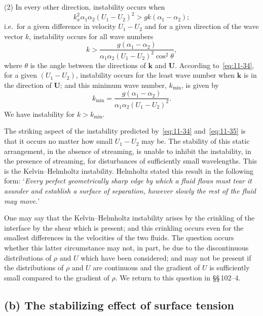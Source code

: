 (2) In every other direction, instability occurs when
\begin{equation}
\label{eq:11-33}
k_x^2\alpha_1\alpha_2(U_1-U_2)^2 > gk(\alpha_1-\alpha_2);
\end{equation}
i.e.\ for a given difference in velocity $U_1-U_2$ and for a given direction of the wave vector $k$, instability occurs for all wave numbers
\begin{equation}
\label{eq:11-34}
k > \frac{g(\alpha_1-\alpha_2)}{\alpha_1\alpha_2(U_1-U_2)^2\cos^2\theta},
\end{equation}
where $\theta$ is the angle between the directions of $\mathbf{k}$ and $\mathbf{U}$. According to~\eqref{eq:11-34}, for a given $(U_1-U_2)$, instability occurs for the least wave number when $\mathbf{k}$ is in the direction of $\mathbf{U}$; and this minimum wave number, $k_{\min}$, is given by
\begin{equation}
\label{eq:11-35}
k_{\min} = \frac{g(\alpha_1-\alpha_2)}{\alpha_1\alpha_2(U_1-U_2)^2}.
\end{equation}
We have instability for $k > k_{\min}$.

The striking aspect of the instability predicted by~\eqref{eq:11-34} and~\eqref{eq:11-35} is that it occurs no matter how small $U_1-U_2$ may be. The stability of this static arrangement, in the absence of streaming, is unable to inhibit the instability, in the presence of streaming, for disturbances of sufficiently small wavelengths. This is the Kelvin--Helmholtz instability. Helmholtz stated this result in the following form: `\textit{Every perfect geometrically sharp edge by which a fluid flows must tear it asunder and establish a surface of separation, however slowly the rest of the fluid may move.}'

One may say that the Kelvin--Helmholtz instability arises by the crinkling of the interface by the shear which is present; and this crinkling occurs even for the smallest differences in the velocities of the two fluids. The question occurs whether this latter circumstance may not, in part, be due to the discontinuous distributions of $\rho$ and $U$ which have been considered; and may not be present if the distributions of $\rho$ and $U$ are continuous and the gradient of $U$ is sufficiently small compared to the gradient of $\rho$. We return to this question in \S\S\,102--4.

\subsection*{(b) The stabilizing effect of surface tension}

